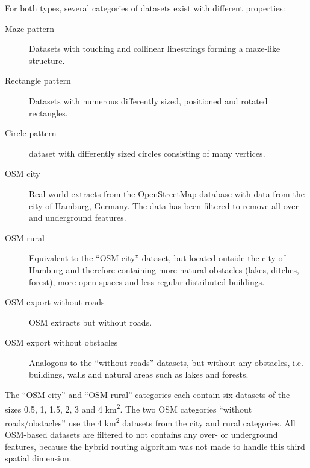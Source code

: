 			For both types, several categories of datasets exist with different properties:
			\begin{description}
				\item[Maze pattern] Datasets with touching and collinear linestrings forming a maze-like structure.
				\item[Rectangle pattern] Datasets with numerous differently sized, positioned and rotated rectangles.
				\item[Circle pattern] dataset with differently sized circles consisting of many vertices.
				\item[OSM city] Real-world extracts from the OpenStreetMap database with data from the city of Hamburg, Germany. The data has been filtered to remove all over- and underground features.
				\item[OSM rural] Equivalent to the \enquote{OSM city} dataset, but located outside the city of Hamburg and therefore containing more natural obstacles (lakes, ditches, forest), more open spaces and less regular distributed buildings.
				\item[OSM export without roads] OSM extracts but without roads.
				\item[OSM export without obstacles] Analogous to the \enquote{without roads} datasets, but without any obstacles, i.e. buildings, walls and natural areas such as lakes and forests.
			\end{description}
			The \enquote{OSM city} and \enquote{OSM rural} categories each contain six datasets of the sizes 0.5, 1, 1.5, 2, 3 and 4 km\textsuperscript{2}.
			The two OSM categories \enquote{without roads/obstacles} use the 4 km\textsuperscript{2} datasets from the city and rural categories.
			All OSM-based datasets are filtered to not contains any over- or underground features, because the hybrid routing algorithm was not made to handle this third spatial dimension.
			
